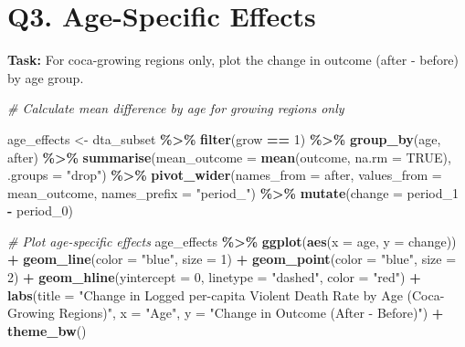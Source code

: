 \documentclass[
]{article}
\newenvironment{Shaded}{\begin{snugshade}}{\end{snugshade}}
\newcommand{\AttributeTok}[1]{\textcolor[rgb]{0.13,0.29,0.53}{#1}}
\newcommand{\CommentTok}[1]{\textcolor[rgb]{0.56,0.35,0.01}{\textit{#1}}}
\newcommand{\ConstantTok}[1]{\textcolor[rgb]{0.56,0.35,0.01}{#1}}
\newcommand{\DecValTok}[1]{\textcolor[rgb]{0.00,0.00,0.81}{#1}}
\newcommand{\FunctionTok}[1]{\textcolor[rgb]{0.13,0.29,0.53}{\textbf{#1}}}
\newcommand{\NormalTok}[1]{#1}
\newcommand{\OtherTok}[1]{\textcolor[rgb]{0.56,0.35,0.01}{#1}}
\newcommand{\SpecialCharTok}[1]{\textcolor[rgb]{0.81,0.36,0.00}{\textbf{#1}}}
\newcommand{\StringTok}[1]{\textcolor[rgb]{0.31,0.60,0.02}{#1}}
\begin{document}
\section{Q3. Age-Specific Effects}\label{q3.-age-specific-effects}

\textbf{Task:} For coca-growing regions only, plot the change in outcome
(after - before) by age group.

\begin{Shaded}
\begin{Highlighting}[]
\CommentTok{\# Calculate mean difference by age for growing regions only}

\NormalTok{age\_effects }\OtherTok{\textless{}{-}}\NormalTok{ dta\_subset }\SpecialCharTok{\%\textgreater{}\%}
  \FunctionTok{filter}\NormalTok{(grow }\SpecialCharTok{==} \DecValTok{1}\NormalTok{) }\SpecialCharTok{\%\textgreater{}\%}
  \FunctionTok{group\_by}\NormalTok{(age, after) }\SpecialCharTok{\%\textgreater{}\%}
  \FunctionTok{summarise}\NormalTok{(}\AttributeTok{mean\_outcome =} \FunctionTok{mean}\NormalTok{(outcome, }\AttributeTok{na.rm =} \ConstantTok{TRUE}\NormalTok{), }\AttributeTok{.groups =} \StringTok{"drop"}\NormalTok{) }\SpecialCharTok{\%\textgreater{}\%}
  \FunctionTok{pivot\_wider}\NormalTok{(}\AttributeTok{names\_from =}\NormalTok{ after, }\AttributeTok{values\_from =}\NormalTok{ mean\_outcome, }\AttributeTok{names\_prefix =} \StringTok{"period\_"}\NormalTok{) }\SpecialCharTok{\%\textgreater{}\%}
  \FunctionTok{mutate}\NormalTok{(}\AttributeTok{change =}\NormalTok{ period\_1 }\SpecialCharTok{{-}}\NormalTok{ period\_0)}

\CommentTok{\# Plot age{-}specific effects}
\NormalTok{age\_effects }\SpecialCharTok{\%\textgreater{}\%}
  \FunctionTok{ggplot}\NormalTok{(}\FunctionTok{aes}\NormalTok{(}\AttributeTok{x =}\NormalTok{ age, }\AttributeTok{y =}\NormalTok{ change)) }\SpecialCharTok{+}
  \FunctionTok{geom\_line}\NormalTok{(}\AttributeTok{color =} \StringTok{"blue"}\NormalTok{, }\AttributeTok{size =} \DecValTok{1}\NormalTok{) }\SpecialCharTok{+}
  \FunctionTok{geom\_point}\NormalTok{(}\AttributeTok{color =} \StringTok{"blue"}\NormalTok{, }\AttributeTok{size =} \DecValTok{2}\NormalTok{) }\SpecialCharTok{+}
  \FunctionTok{geom\_hline}\NormalTok{(}\AttributeTok{yintercept =} \DecValTok{0}\NormalTok{, }\AttributeTok{linetype =} \StringTok{"dashed"}\NormalTok{, }\AttributeTok{color =} \StringTok{"red"}\NormalTok{) }\SpecialCharTok{+}
  \FunctionTok{labs}\NormalTok{(}\AttributeTok{title =} \StringTok{"Change in Logged per{-}capita Violent Death Rate by Age (Coca{-}Growing Regions)"}\NormalTok{,}
       \AttributeTok{x =} \StringTok{"Age"}\NormalTok{,}
       \AttributeTok{y =} \StringTok{"Change in Outcome (After {-} Before)"}\NormalTok{) }\SpecialCharTok{+}
  \FunctionTok{theme\_bw}\NormalTok{()}
\end{Highlighting}
\end{Shaded}
\end{document}
